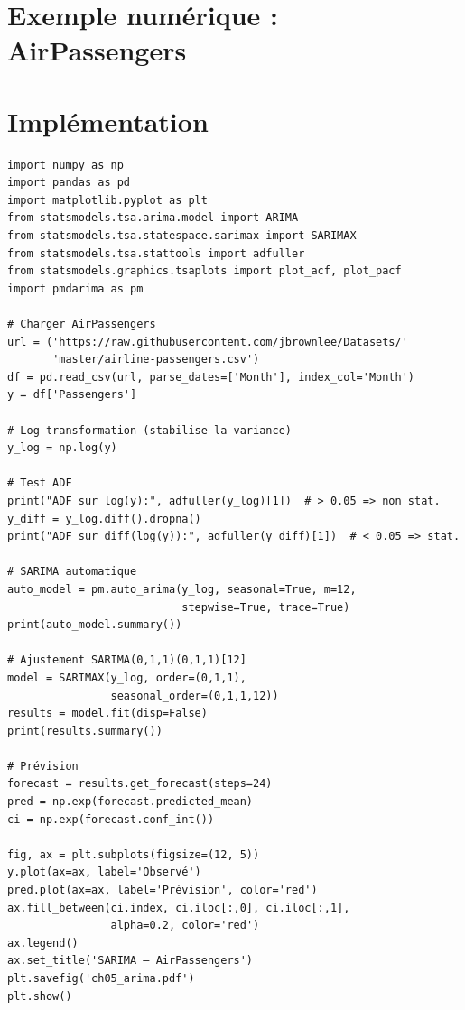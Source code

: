 \section{Exemple num\'erique : AirPassengers}

\begin{center}
\end{center}

\section{Impl\'ementation}

\begin{codeblock}[title=\textbf{Python}]
\begin{verbatim}
import numpy as np
import pandas as pd
import matplotlib.pyplot as plt
from statsmodels.tsa.arima.model import ARIMA
from statsmodels.tsa.statespace.sarimax import SARIMAX
from statsmodels.tsa.stattools import adfuller
from statsmodels.graphics.tsaplots import plot_acf, plot_pacf
import pmdarima as pm

# Charger AirPassengers
url = ('https://raw.githubusercontent.com/jbrownlee/Datasets/'
       'master/airline-passengers.csv')
df = pd.read_csv(url, parse_dates=['Month'], index_col='Month')
y = df['Passengers']

# Log-transformation (stabilise la variance)
y_log = np.log(y)

# Test ADF
print("ADF sur log(y):", adfuller(y_log)[1])  # > 0.05 => non stat.
y_diff = y_log.diff().dropna()
print("ADF sur diff(log(y)):", adfuller(y_diff)[1])  # < 0.05 => stat.

# SARIMA automatique
auto_model = pm.auto_arima(y_log, seasonal=True, m=12,
                           stepwise=True, trace=True)
print(auto_model.summary())

# Ajustement SARIMA(0,1,1)(0,1,1)[12]
model = SARIMAX(y_log, order=(0,1,1),
                seasonal_order=(0,1,1,12))
results = model.fit(disp=False)
print(results.summary())

# Prévision
forecast = results.get_forecast(steps=24)
pred = np.exp(forecast.predicted_mean)
ci = np.exp(forecast.conf_int())

fig, ax = plt.subplots(figsize=(12, 5))
y.plot(ax=ax, label='Observé')
pred.plot(ax=ax, label='Prévision', color='red')
ax.fill_between(ci.index, ci.iloc[:,0], ci.iloc[:,1],
                alpha=0.2, color='red')
ax.legend()
ax.set_title('SARIMA — AirPassengers')
plt.savefig('ch05_arima.pdf')
plt.show()
\end{verbatim}
\end{codeblock}

